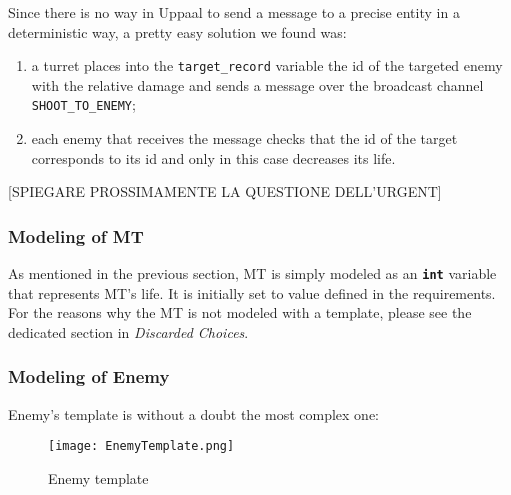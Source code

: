 \documentclass[
10pt, %
a4paper, %
oneside, %
headinclude,footinclude, %
BCOR5mm, %
]{scrartcl}
\begin{document}
	Since there is no way in Uppaal to send a message to a precise entity in a deterministic way, a pretty easy solution we found was:
	\begin{enumerate}
		\item a turret places into the \texttt{target\_record} variable the id of the targeted enemy with the relative damage and sends a message over the broadcast channel \texttt{SHOOT\_TO\_ENEMY};
		\item each enemy that receives the message checks that the id of the target corresponds to its id and only in this case decreases its life.
	\end{enumerate}
	[SPIEGARE PROSSIMAMENTE LA QUESTIONE DELL'URGENT]
	
	\subsubsection{Modeling of MT}
	As mentioned in the previous section, MT is simply modeled as an \texttt{\textbf{int}} variable that represents MT's life. It is initially set to value defined in the requirements. For the reasons why the MT is not modeled with a template, please see the dedicated section in \emph{Discarded Choices}.
	
	\subsubsection{Modeling of Enemy}
	Enemy's template is without a doubt the most complex one:
	
	\begin{figure}[h!]
		\centering
		\texttt{[image: EnemyTemplate.png]}
		\caption{Enemy template}
	\end{figure}
	
\end{document}
